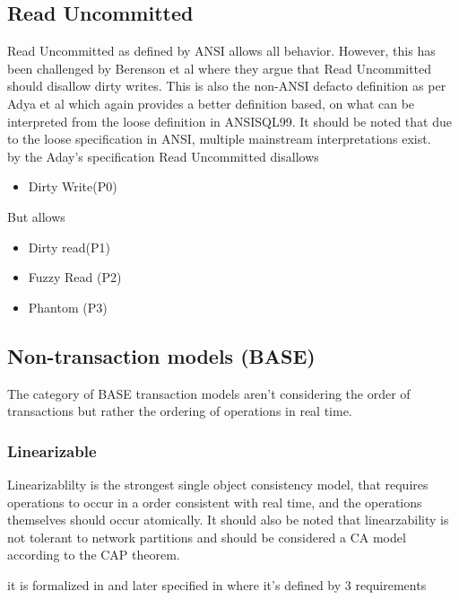 \documentclass[a4paper,10pt,titlepage]{report}
\begin{document}

    \subsection{Read Uncommitted}
    Read Uncommitted as defined by ANSI allows all behavior. However, this has been challenged by Berenson et al\cite{Berensonetal} where they argue that Read Uncommitted should disallow dirty writes. This is also the non-ANSI defacto definition as per Adya et al \cite{Adya99weakconsistency} which again provides a better definition based, on what can be interpreted from the loose definition in ANSISQL99\cite{ansisql1999}. It should be noted that due to the loose specification in ANSI, multiple mainstream interpretations exist.\\

    by the Aday's specification Read Uncommitted disallows
    \begin{itemize}
        \item Dirty Write(P0)
    \end{itemize}
    But allows
    \begin{itemize}
        \item Dirty read(P1)
        \item Fuzzy Read (P2)
        \item Phantom (P3)
    \end{itemize}

    \subsection{Non-transaction models (BASE)}
    The category of BASE transaction models aren't considering the order of transactions but rather the ordering of operations in real time.

    \subsubsection{Linearizable}
    Linearizablilty is the strongest single object consistency model, that requires operations to occur in a order consistent with real time, and the operations themselves should occur atomically. It should also be noted that linearzability is not tolerant to network partitions and should be considered a CA model according to the CAP theorem.

    it is formalized  in \cite{Linearizability} and later specified  in \cite{ConsistencyinNonTransactionalDistributedStorageSystems} where it's defined by 3 requirements
\end{document}

